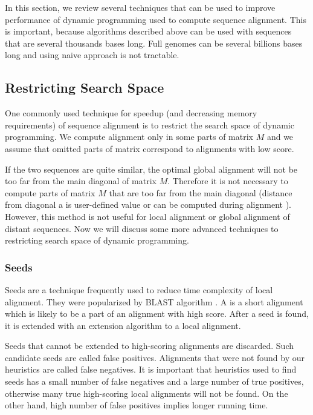 
In this section, we review several techniques that can be used to improve
performance of dynamic programming used to compute sequence alignment.  This is
important, because algorithms described above can be used with sequences that
are several thousands bases long. Full genomes can be several billions bases
long and using naive approach is not tractable. 

\subsection{Restricting Search Space}

One commonly used technique for speedup (and decreasing memory requirements) of
sequence alignment is to restrict the search space of dynamic programming. We
compute alignment only in some parts of matrix $M$ and we assume that omitted
parts of matrix correspond to alignments with low score. 

If the two sequences are quite similar, the optimal global alignment will not be
too far from the main diagonal of matrix $M$. Therefore it is not necessary to compute
parts of matrix $M$ that are too far from the main diagonal \cite{Chao1992} (distance from
diagonal a is
user-defined value or can be computed during alignment \cite{GusfieldBook}).
However, this method is not useful for local alignment or global alignment of 
distant sequences. Now we will discuss some more advanced techniques to
restricting search space of dynamic programming.



\subsubsection{Seeds}

Seeds are a technique frequently  used to reduce time complexity of local
alignment.  They were popularized by BLAST algorithm \cite{Altschul1990}.  A
 is a short alignment which is likely to be a part of an
alignment with high score. After a seed is found, it is extended with an
extension algorithm to a local alignment.

Seeds that cannot be extended to high-scoring alignments are discarded. Such
candidate seeds are called false positives.  Alignments that were not found by
our heuristics are called false negatives.  It is important that heuristics
used to find seeds has a small number of false negatives and a large number of
true positives, otherwise many true high-scoring local alignments will not be
found. On the other hand, high number of false positives implies longer running
time. 


